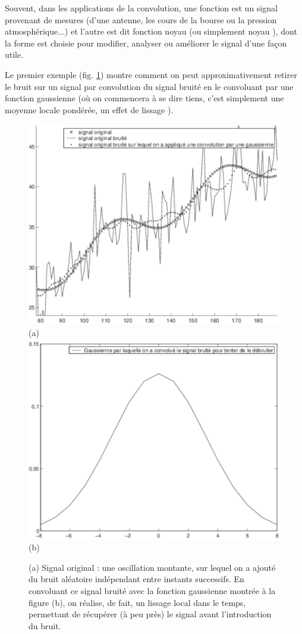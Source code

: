 Souvent, dans les applications de la convolution, une fonction est un
signal provenant de mesures (d'une antenne, les cours de la bourse ou
la pression atmosphérique...) et l'autre est dit { fonction noyau } (ou
simplement { noyau }), dont la forme est choisie pour modifier, analyser
ou améliorer le signal d'une façon utile.

\begin{example}
Le premier exemple (fig. \ref{fig:ex1}) montre comment on peut
approximativement { retirer le bruit } sur un signal par
convolution du signal bruité en le convoluant par une fonction
gaussienne (où on commencera à se dire { tiens, c'est simplement une
moyenne locale pondérée, un effet de lissage }).
%
\begin{figure}[h]
%
\includegraphics[scale=0.32]{con2.pdf}(a)
\includegraphics[scale=0.32]{con3.pdf}(b)
%
\caption{(a) Signal original : une oscillation montante, sur lequel on
a ajouté du bruit aléatoire indépendant entre instants successifs. En
convoluant ce signal bruité avec la fonction gaussienne montrée à la
figure (b), on réalise, de fait, un lissage local dans le temps,
permettant de récupérer (à peu près) le signal avant l'introduction du
bruit.}
%
\label{fig:ex1}
\end{figure}
\end{example}

